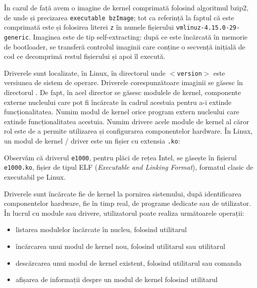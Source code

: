 În cazul de față avem o imagine de kernel comprimată folosind algoritmul bzip2,
de unde și precizarea \texttt{executable bzImage}; tot ca referință la faptul că este
comprimată este și folosirea literei \texttt{z} în numele fișierului
\texttt{vmlinuz-4.15.0-29-generic}. Imaginea este de tip self-extracting: după ce este
încărcată în memorie de bootloader, se transferă controlul imaginii care conține
o secvență inițială de cod ce decomprimă restul fișierului și apoi îl execută.

Driverele sunt localizate, în Linux, în directorul 
unde \texttt{$<$version$>$} este versiunea de sistem de operare. Driverele
corespunzătoare imaginii  se găsesc în directorul
. De fapt, în acel director se
găsesc modulele de kernel, componente externe nucleului care pot fi încărcate în
cadrul acestuia pentru a-i extinde funcționalitatea. Numim modul de kernel orice program extern nucleului care extinde funcționalitatea acestuia. Numim drivere acele module de kernel al căror rol este de a permite
utilizarea și configurarea componentelor hardware.  În Linux, un modul de kernel / driver este un fișier cu extensia \texttt{.ko}:


Observăm că driverul \texttt{e1000}, pentru plăci de rețea Intel, se găsește în fișierul
\texttt{e1000.ko}, fișier de tipul ELF  (\textit{Executable
and Linking Format}), formatul clasic de executabil pe Linux.

Driverele sunt încărcate fie de kernel la pornirea sistemului, după
identificarea componentelor hardware, fie în timp real, de programe dedicate sau
de utilizator. În lucrul cu module sau drivere, utilizatorul poate realiza
următoarele operații:

\begin{itemize}
  \item listarea modulelor încărcate în nucleu, folosind utilitarul 
  \item încărcarea unui modul de kernel nou, folosind utilitarul  sau
    utilitarul 
  \item descărcarea unui modul de kernel existent, folosind utilitarul 
    sau comanda 
  \item afișarea de informații despre un modul de kernel folosind utilitarul 
\end{itemize}

